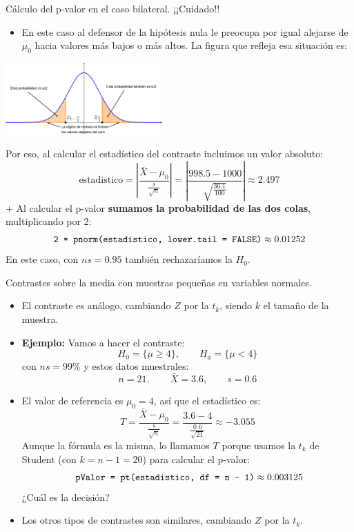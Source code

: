 \documentclass[
  9pt,
  ignorenonframetext,
]{beamer}
\providecommand{\tightlist}{%
  \setlength{\itemsep}{0pt}\setlength{\parskip}{0pt}}
\begin{document}
\begin{frame}{Cálculo del p-valor en el caso bilateral. ¡¡Cuidado!!}
\protect\hypertarget{calculo-del-p-valor-en-el-caso-bilateral.-cuidado}{}

\begin{itemize}
\tightlist
\item
  En este caso al defensor de la hipótesis nula le preocupa por igual
  alejarse de \(\mu_0\) hacia valores más bajos o más altos. La figura
  que refleja esa situación es:
\end{itemize}

\begin{center}\includegraphics[width=6cm]{../fig/07-04-RegionRechazoNormalBilateral} \end{center}

Por eso, al calcular el estadístico del contraste incluimos un valor
absoluto:\small
\[\text{estadistico} = \left|\dfrac{\bar X - \mu_0}{\frac{s}{\sqrt{n}}}\right| = 
  \left|\dfrac{998.5 - 1000}{\sqrt{\frac{36.1}{100}}} \right|\approx 
  2.497
  \]\normalsize + Al calcular el p-valor \textbf{sumamos la probabilidad
de las dos colas}, multiplicando por 2: \[
  \text{\tt 2 * pnorm(estadistico, lower.tail = FALSE)} \approx 0.01252
  \] En este caso, con \(ns = 0.95\) también rechazaríamos la \(H_0\).

\end{frame}

\begin{frame}{Contrastes sobre la media con muestras pequeñas en
variables normales.}
\protect\hypertarget{contrastes-sobre-la-media-con-muestras-pequenas-en-variables-normales.}{}

\begin{itemize}
\item
  El contraste es análogo, cambiando \(Z\) por la \(t_k\), siendo \(k\)
  el tamaño de la muestra.
\item
  \textbf{Ejemplo:} Vamos a hacer el contraste:
  \[H_0 = \{\mu \geq 4\}, \qquad H_a = \{\mu < 4\}\] con \(ns = 99\%\) y
  estos datos muestrales: \[
  n = 21,\qquad \bar X = 3.6, \qquad s = 0.6
  \]
\item
  El valor de referencia es \(\mu_0 = 4\), así que el estadístico es: \[
  T = \dfrac{\bar X - \mu_0}{\frac{s}{\sqrt{n}}} =
  \dfrac{3.6 - 4}{\frac{0.6}{\sqrt{21}}}\approx
  -3.055
  \] Aunque la fórmula es la misma, lo llamamos \(T\) porque usamos la
  \(t_k\) de Student (con \(k = n - 1 = 20\)) para calcular el p-valor:
  \[
  \text{ \tt pValor = pt(estadistico, df = n - 1)} \approx 0.003125
  \] ¿Cuál es la decisión?
\item
  Los otros tipos de contrastes son similares, cambiando \(Z\) por la
  \(t_k\).
\end{itemize}

\end{frame}
\end{document}
